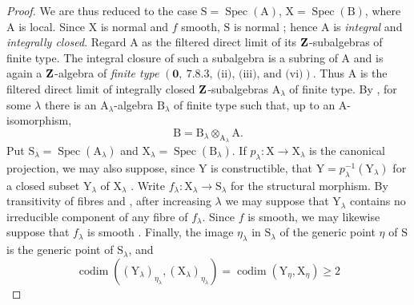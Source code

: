 \begin{proof}
We are thus reduced to the case $\mathrm{S}=\operatorname{Spec}(\mathrm{A})$, $\mathrm{X}=\operatorname{Spec}(\mathrm{B})$, where $\mathrm{A}$ is local. Since $\mathrm{X}$ is normal and $f$ smooth, $\mathrm{S}$ is normal ; hence $\mathrm{A}$ is \emph{integral} and \emph{integrally closed}. Regard $\mathrm{A}$ as the filtered direct limit of its $\mathbf{Z}$-subalgebras of finite type. The integral closure of such a subalgebra is a subring of $\mathrm{A}$ and is again a $\mathbf{Z}$-algebra of \emph{finite type} $(\mathbf{0},\ 7.8.3,\ \text{(ii), (iii), and (vi)})$. Thus $\mathrm{A}$ is the filtered direct limit of integrally closed $\mathbf{Z}$-subalgebras $\mathrm{A}_\lambda$ of finite type. By , for some $\lambda$ there is an $\mathrm{A}_\lambda$-algebra $\mathrm{B}_\lambda$ of finite type such that, up to an $\mathrm{A}$-isomorphism,
\[
  \mathrm{B}=\mathrm{B}_\lambda\otimes_{\mathrm{A}_\lambda}\mathrm{A}.
\]
Put $\mathrm{S}_\lambda=\operatorname{Spec}(\mathrm{A}_\lambda)$ and $\mathrm{X}_\lambda=\operatorname{Spec}(\mathrm{B}_\lambda)$. If $p_\lambda:\mathrm{X}\to\mathrm{X}_\lambda$ is the canonical projection, we may also suppose, since $\mathrm{Y}$ is constructible, that $\mathrm{Y}=p_\lambda^{-1}(\mathrm{Y}_\lambda)$ for a closed subset $\mathrm{Y}_\lambda$ of $\mathrm{X}_\lambda$ . Write $f_\lambda:\mathrm{X}_\lambda\to\mathrm{S}_\lambda$ for the structural morphism. By transitivity of fibres and , after increasing $\lambda$ we may suppose that $\mathrm{Y}_\lambda$ contains no irreducible component of any fibre of $f_\lambda$. Since $f$ is smooth, we may likewise suppose that $f_\lambda$ is smooth . Finally, the image $\eta_\lambda$ in $\mathrm{S}_\lambda$ of the generic point $\eta$ of $\mathrm{S}$ is the generic point of $\mathrm{S}_\lambda$, and
\[
  \operatorname{codim}((\mathrm{Y}_\lambda)_{\eta_\lambda},
  (\mathrm{X}_\lambda)_{\eta_\lambda})
  =\operatorname{codim}(\mathrm{Y}_\eta,\mathrm{X}_\eta)\geq2
\]

\end{proof}

